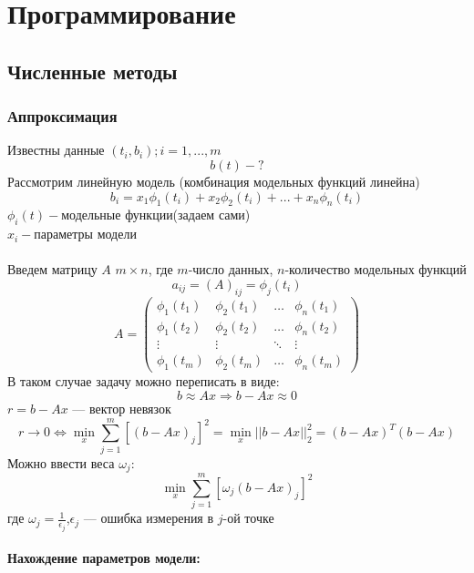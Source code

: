 %

\section{Программирование}


\subsection{Численные методы}

\subsubsection{Аппроксимация}
Известны данные $(t_{i},b_{i});i=1,...,m$
$$b(t)-?$$
Рассмотрим линейную модель (комбинация модельных функций линейна)
$$b_{i}=x_{1}\phi_{1}(t_{i})+x_{2}\phi_{2}(t_{i})+...+x_{n}\phi_{n}(t_{i})$$
$\phi_{i}(t)-$модельные функции(задаем сами)\\
$x_{i}-$параметры модели\\\\
Введем матрицу $A$ $m\times n$, где $m$-число данных, $n$-количество модельных функций
$$a_{ij}=\left(A\right)_{ij}=\phi_{j}(t_{i})$$
\begin{equation*}
A = \left(
\begin{array}{cccc}
\phi_{1}(t_{1}) & \phi_{2}(t_{1}) & \ldots & \phi_{n}(t_{1})\\
\phi_{1}(t_{2}) & \phi_{2}(t_{2}) & \ldots & \phi_{n}(t_{2})\\
\vdots & \vdots & \ddots & \vdots\\
\phi_{1}(t_{m}) & \phi_{2}(t_{m}) & \ldots & \phi_{n}(t_{m})
\end{array}
\right)
\end{equation*}
В таком случае задачу можно переписать в виде:
$$b\approx Ax\Longrightarrow b-Ax\approx 0$$
$r=b-Ax$ --- вектор невязок\\
$$r\longrightarrow 0\Leftrightarrow \min_{x}\sum_{j=1}^{m}[(b-Ax)_{j}]^{2}=\min_{x}||b-Ax||_{2}^{2}=(b-Ax)^{T}(b-Ax)$$
Можно ввести веса $\omega_{j}:$ $$\min_{x}\sum_{j=1}^{m}[\omega_{j}(b-Ax)_{j}]^{2}$$
где $\omega_{j}=\frac{1}{\epsilon_{j}}$,$\epsilon_{j}$ --- ошибка измерения в $j$-ой точке\\\\
\textbf{Нахождение параметров модели:}
